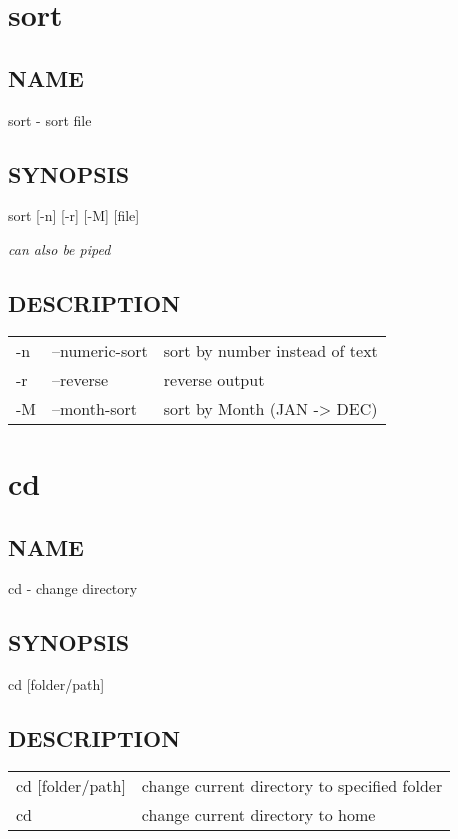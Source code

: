 \documentclass[11pt]{book}
\begin{document}
\chapter{sort}
\label{sec-1-3}
\section{NAME}
\label{sec-1-3-1}
sort - sort file
\section{SYNOPSIS}
\label{sec-1-3-2}
sort [-n] [-r] [-M] [file]

\emph{can also be piped}
\section{DESCRIPTION}
\label{sec-1-3-3}
\begin{center}
\begin{tabular}{lll}
-n & --numeric-sort & sort by number instead of text\\
-r & --reverse & reverse output\\
-M & --month-sort & sort by Month (JAN -> DEC)\\
\end{tabular}
\end{center}

\chapter{cd}
\label{sec-1-4}
\section{NAME}
\label{sec-1-4-1}
cd - change directory
\section{SYNOPSIS}
\label{sec-1-4-2}
cd [folder/path]
\section{DESCRIPTION}
\label{sec-1-4-3}
\begin{center}
\begin{tabular}{ll}
cd [folder/path] & change current directory to specified folder\\
cd & change current directory to home\\
\end{tabular}
\end{center}
\end{document}
